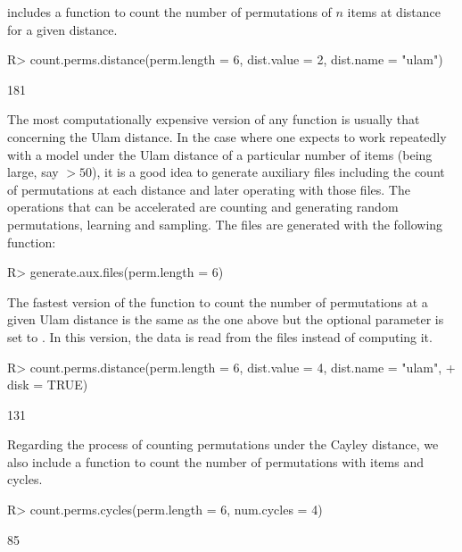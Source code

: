\documentclass[article,nojss]{jss}
\begin{document}
 includes a function to count the number of permutations of $n$ items at distance  for a given distance.
\begin{Schunk}
\begin{Sinput}
R> count.perms.distance(perm.length = 6, dist.value = 2, dist.name = "ulam")
\end{Sinput}
\begin{Soutput}
[1] 181
\end{Soutput}
\end{Schunk}

The most computationally expensive version of any function is usually that concerning the Ulam distance. In the case where one expects to work repeatedly with a model under the Ulam distance of a particular  number of items (being  large, say  $>50$), it is a good idea to generate auxiliary files including the count of permutations at each distance and later operating with those files. The operations that can be accelerated are counting and generating random permutations, learning and sampling. The files are generated with the following function:

\begin{Schunk}
\begin{Sinput}
R> generate.aux.files(perm.length = 6)
\end{Sinput}
\end{Schunk}

The fastest version of the function to count the number of permutations at a given Ulam distance is the same as the one above but the optional parameter  is set to . In this version, the data is read from the files instead of computing it.  

\begin{Schunk}
\begin{Sinput}
R> count.perms.distance(perm.length = 6, dist.value = 4, dist.name = "ulam", 
+     disk = TRUE)
\end{Sinput}
\begin{Soutput}
[1] 131
\end{Soutput}
\end{Schunk}

Regarding the process of counting permutations under the Cayley distance, we also include a function to count the number of permutations with  items and  cycles. 
\begin{Schunk}
\begin{Sinput}
R> count.perms.cycles(perm.length = 6, num.cycles = 4)
\end{Sinput}
\begin{Soutput}
[1] 85
\end{Soutput}
\end{Schunk}
\end{document}

